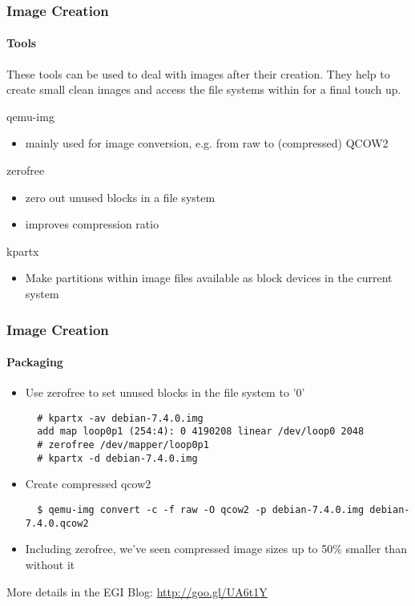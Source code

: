 \begin{frame}
\frametitle{Image Creation}
\framesubtitle{Tools}
These tools can be used to deal with images after their creation. They
help to create small clean images and access the file systems within
for a final touch up.

qemu-img
\begin{itemize}
\item mainly used for image conversion, e.g. from raw to (compressed) QCOW2
\end{itemize}
zerofree
\begin{itemize}
\item zero out unused blocks in a file system
\item improves compression ratio
\end{itemize}
kpartx
\begin{itemize}
\item Make partitions within image files available as block devices in the current system
\end{itemize}
\end{frame}

\begin{frame}[fragile]
\frametitle{Image Creation}
\framesubtitle{Packaging}
\begin{itemize}
\item Use zerofree to set unused blocks in the file system to '0'
  \begin{lstlisting}
  # kpartx -av debian-7.4.0.img
  add map loop0p1 (254:4): 0 4190208 linear /dev/loop0 2048
  # zerofree /dev/mapper/loop0p1
  # kpartx -d debian-7.4.0.img
  \end{lstlisting}
\item Create compressed qcow2
  \begin{lstlisting}
  $ qemu-img convert -c -f raw -O qcow2 -p debian-7.4.0.img debian-7.4.0.qcow2
  \end{lstlisting}
\item Including zerofree, we've seen compressed image sizes up to 50\% smaller
  than without it
\end{itemize}
\hfill\scriptsize More details in the EGI Blog:
  \url{http://goo.gl/UA6t1Y}
\end{frame}

